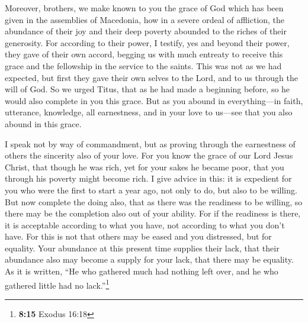  Moreover, brothers, we make known to you the grace of God
which has been given in the assemblies of Macedonia,  how
in a severe ordeal of affliction, the abundance of their joy and their
deep poverty abounded to the riches of their generosity. 
For according to their power, I testify, yes and beyond their power,
they gave of their own accord,  begging us with much
entreaty to receive this grace and the fellowship in the service to the
saints.  This was not as we had expected, but first they
gave their own selves to the Lord, and to us through the will of God.
 So we urged Titus, that as he had made a beginning
before, so he would also complete in you this grace.  But
as you abound in everything---in faith, utterance, knowledge, all
earnestness, and in your love to us---see that you also abound in this
grace.

 I speak not by way of commandment, but as proving through
the earnestness of others the sincerity also of your love.
 For you know the grace of our Lord Jesus Christ, that
though he was rich, yet for your sakes he became poor, that you through
his poverty might become rich.  I give advice in this: it
is expedient for you who were the first to start a year ago, not only to
do, but also to be willing.  But now complete the doing
also, that as there was the readiness to be willing, so there may be the
completion also out of your ability.  For if the
readiness is there, it is acceptable according to what you have, not
according to what you don't have.  For this is not that
others may be eased and you distressed,  but for
equality. Your abundance at this present time supplies their lack, that
their abundance also may become a supply for your lack, that there may
be equality.  As it is written, ``He who gathered much
had nothing left over, and he who gathered little had no
lack.''\footnote{\textbf{8:15} Exodus 16:18}

